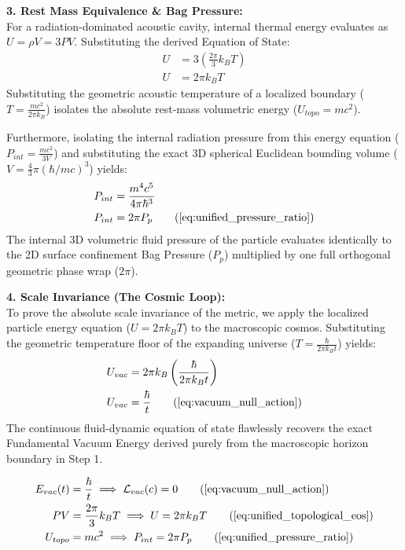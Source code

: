 \documentclass[11pt, a4paper]{article}
\begin{document}
\textbf{3. Rest Mass Equivalence \& Bag Pressure:} \\
For a radiation-dominated acoustic cavity, internal thermal energy evaluates as $U = \rho V = 3PV$. Substituting the derived Equation of State:
\begin{align}
    U &= 3 \left( \frac{2\pi}{3} k_B T \right)  \\
    U &= 2\pi k_B T 
\end{align}
Substituting the geometric acoustic temperature of a localized boundary ($T = \frac{mc^2}{2\pi k_B}$) isolates the absolute rest-mass volumetric energy ($U_{topo} = mc^2$). 

Furthermore, isolating the internal radiation pressure from this energy equation ($P_{int} = \frac{m c^2}{3 V}$) and substituting the exact 3D spherical Euclidean bounding volume ($V = \frac{4}{3}\pi (\hbar/mc)^3$) yields:
\begin{align}
    P_{int} &= \frac{m^4 c^5}{4\pi \hbar^3}  \\
    P_{int} &= 2\pi P_p \tag{\ref{eq:unified_pressure_ratio}}
\end{align}
The internal 3D volumetric fluid pressure of the particle evaluates identically to the 2D surface confinement Bag Pressure ($P_p$) multiplied by one full orthogonal geometric phase wrap ($2\pi$).

\textbf{4. Scale Invariance (The Cosmic Loop):} \\
To prove the absolute scale invariance of the metric, we apply the localized particle energy equation ($U = 2\pi k_B T$) to the macroscopic cosmos. Substituting the geometric temperature floor of the expanding universe ($T = \frac{\hbar}{2\pi k_B t}$) yields:
\begin{align}
    U_{vac} &= 2\pi k_B \left( \frac{\hbar}{2\pi k_B t} \right)  \\
    U_{vac} &= \frac{\hbar}{t} \tag{\ref{eq:vacuum_null_action}}
\end{align}
The continuous fluid-dynamic equation of state flawlessly recovers the exact Fundamental Vacuum Energy derived purely from the macroscopic horizon boundary in Step 1.

\begin{tcolorbox}[recallbox, title={\ref{box:unified_eos}. The Unified Equation of State}]
\begin{align}
    E_{vac}(t) &= \frac{\hbar}{t} \implies \mathcal{L}_{vac}(c) = 0 \tag{\ref{eq:vacuum_null_action}} \\
    PV &= \frac{2\pi}{3} k_B T \implies U = 2\pi k_B T \tag{\ref{eq:unified_topological_eos}} \\
    U_{topo} &= mc^2 \implies P_{int} = 2\pi P_p \tag{\ref{eq:unified_pressure_ratio}}
\end{align}
\end{tcolorbox}
\end{document}
